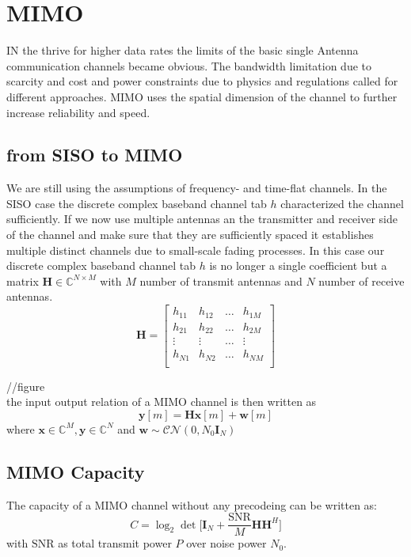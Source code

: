 \section{MIMO}
IN the thrive for higher data rates the limits of the basic single Antenna communication channels became obvious. The bandwidth limitation due to scarcity and cost and power constraints due to physics and regulations called for different approaches. MIMO uses the spatial dimension of the channel to further increase reliability and speed.

\subsection{from SISO to MIMO}
We are still using the assumptions of frequency- and time-flat channels. In the SISO case the discrete complex baseband channel tab $h$ characterized the channel sufficiently. If we now use multiple antennas an the transmitter and receiver side of the channel and make sure that they are sufficiently spaced it establishes multiple distinct channels due to small-scale fading processes. In this case our discrete complex baseband channel tab $h$ is no longer a single coefficient but a matrix $\mathbf{H}\in\mathbb{C}^{N\times M}$ with $M$ number of transmit antennas and $N$ number of receive antennas. 
\begin{equation}
	\mathbf{H} = \begin{bmatrix}
		h_{11} & h_{12} & \hdots & h_{1M} \\
		h_{21} & h_{22} & \hdots & h_{2M} \\
		\vdots & \vdots & \hdots & \vdots \\
		h_{N1} & h_{N2} & \hdots & h_{NM} \\
	\end{bmatrix}
\end{equation}

//figure \\
the input output relation of a MIMO channel is then written as 
\begin{equation}
\mathbf{y}[m] = \mathbf{Hx}[m] + \mathbf{w}[m]
\end{equation}
where $\mathbf{x}\in\mathbb{C}^M , \mathbf{y}\in\mathbb{C}^N$ and $\mathbf{w}\sim\mathcal{CN}(0,N_0\mathbf{I}_N)$


\subsection{MIMO Capacity}
The capacity of a MIMO channel without any precodeing can be written as:
\begin{equation}
	C = \log_2{\det{\Biggr[\mathbf{I}_N + \frac{\text{SNR}}{M}\mathbf{HH}^H\Biggl]}}
\end{equation}
with $\text{SNR}$ as total transmit power $P$ over noise power $N_0$.


